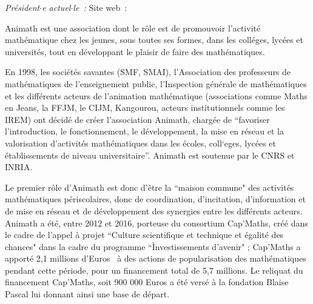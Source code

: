 \emph{Pr\'esident$\cdot$e actuel$\cdot$le~: } \hfill Site web~: 
\smallskip

Animath est une association dont le r\^ole est de promouvoir l’activit\'e math\'ematique chez les jeunes, sous toutes ses
formes, dans les coll\'eges, lyc\'ees et universit\'es, tout en d\'eveloppant le plaisir de faire des math\'ematiques. 

En 1998, les soci\'et\'es savantes (SMF, SMAI), l’Association des professeurs de math\'ematiques de l’enseignement public, l’Inspection g\'en\'erale de math\'ematiques et les diff\'erents acteurs de l’animation math\'ematique (associations comme Maths en Jeans, la FFJM, le CIJM, Kangourou, acteurs institutionnels comme les IREM) ont d\'ecid\'e de cr\'eer l’association Animath, charg\'ee de ``favoriser l’introduction, le fonctionnement, le 
d\'eveloppement, la mise en r\'eseau et la valorisation d’activit\'es math\'ematiques dans les \'ecoles, coll`eges, lyc\'ees et \'etablissements de niveau universitaire”. Animath est soutenue par le CNRS et INRIA.

Le premier r\^ole d’Animath est donc d'\^etre la ``maison commune" des activit\'es math\'ematiques p\'eriscolaires, donc de coordination, d’incitation, d'information et de mise en r\'eseau et de d\'eveloppement des synergies 
entre les diff\'erents acteurs.  Animath a \'et\'e, entre 2012 et 2016, porteuse du consortium Cap’Maths, 
cr\'e\'e dans le cadre de l’appel \`a projet ``Culture scientifique et technique et \'egalit\'e des chances" dans la cadre du programme ``Ìnvestissements d'avenir" ; Cap'Maths a apport\'e 2,1 millions d'Euros \ \`a des actions de popularisation des math\'ematiques pendant cette p\'eriode, pour un financement total de 5,7 millions. Le reliquat du financement 
Cap'Maths, soit 900 000 Euros a \'et\'e vers\'e \`a la fondation Blaise Pascal lui donnant ainsi une base de d\'epart. 

